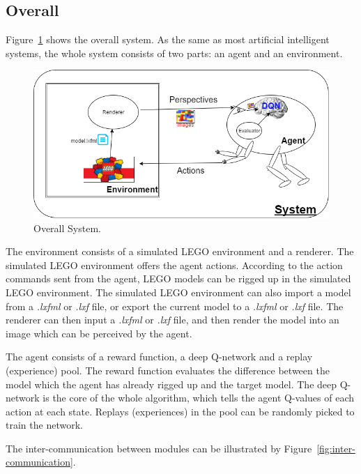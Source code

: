 \documentclass[a4paper]{article}
\begin{document}
        \subsection{Overall}
        
            Figure~\ref{fig:system1} shows the overall system. As the same as most artificial intelligent systems, the whole system consists of two parts: an agent and an environment.
            \begin{figure}[h]
                \centering
                \includegraphics[width=\textwidth]{agent_env.png}
                \caption{Overall System.}
                \label{fig:system1}
            \end{figure}
            
            The environment consists of a simulated LEGO environment and a renderer. The simulated LEGO environment offers the agent actions. According to the action commands sent from the agent, LEGO models can be rigged up in the simulated LEGO environment. The simulated LEGO environment can also import a model from a \textit{.lxfml} or \textit{.lxf} file, or export the current model to a \textit{.lxfml} or \textit{.lxf} file. The renderer can then input a \textit{.lxfml} or \textit{.lxf} file, and then render the model into an image which can be perceived by the agent. 
            
            The agent consists of a reward function, a deep Q-network and a replay (experience) pool. The reward function evaluates the difference between the model which the agent has already rigged up and the target model. The deep Q-network is the core of the whole algorithm, which tells the agent Q-values of each action at each state. Replays (experiences) in the pool can be randomly picked to train the network. 
            
            The inter-communication between modules can be illustrated by Figure~\ref{fig:inter-communication}. 
            
\end{document}
